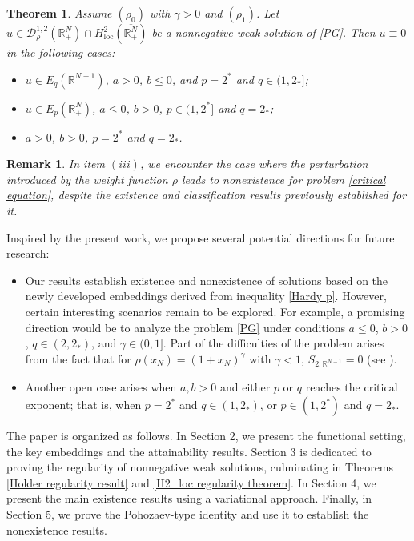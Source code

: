 \documentclass[12pt,reqno]{amsart}
\newtheorem{theorem}{Theorem}[section]
\newtheorem{remark}{Remark}[section]
\begin{document}
\begin{theorem}\label{Nonexistence2}Assume $(\rho_0)$ with $\gamma>0$ and $(\rho_1)$. Let $u\in \mathcal{D}^{1,2}_\rho(\mathds{R}^N_+)\cap H^2_{\mathrm{loc}}(\overline{\mathds{R}^N_+})$ be a nonnegative weak solution of \eqref{PG}. Then $u\equiv 0$ in the following cases:
\begin{itemize}
\item[$(i)$] $u\in E_q(\mathds{R}^{N-1})$, $a > 0$, $b \leq 0$, and $p = 2^\ast$ and $q\in(1,2_\ast]$;
\item[$(ii)$] $u\in E_p(\mathds{R}^N_+)$, $a \leq 0$, $b > 0$, $p\in(1,2^\ast]$ and $q = 2_\ast$;
\item [$(iii)$] $a>0$, $b>0$, $p= 2^\ast$ and $q= 2_\ast$.
\end{itemize}
\end{theorem}

\begin{remark}
In item $(iii)$, we encounter the case where the perturbation introduced by the weight function $\rho$ leads to nonexistence for problem \eqref{critical equation}, despite the existence and classification results previously established for it.
\end{remark}

Inspired by the present work, we propose several potential directions for future research:

\begin{itemize}
\item Our results establish existence and nonexistence of solutions based on the newly developed embeddings derived from inequality \eqref{Hardy p}. However, certain interesting scenarios remain to be explored. For example, a promising direction would be to analyze the problem \eqref{PG} under conditions $a \leq 0$, $b > 0$, $q \in (2, 2_\ast)$, and $\gamma \in (0,1]$. Part of the difficulties of the problem arises from the fact that for $\rho(x_N)=(1+x_N)^\gamma$ with $\gamma<1$, $S_{2,\mathds{R}^{N-1}}=0$ (see \cite[Theorem 2]{Do-Freire-Medeiros 2}).

\item Another open case arises when $a, b > 0$ and either $p$ or $q$ reaches the critical exponent; that is, when $p = 2^\ast$ and $q \in (1, 2_\ast)$, or $p \in (1, 2^\ast)$ and $q = 2_\ast$.
\end{itemize}

The paper is organized as follows. In Section 2, we present the functional setting, the key embeddings and the attainability results. Section 3 is dedicated to proving the regularity of nonnegative weak solutions, culminating in Theorems \ref{Holder regularity result} and \ref{H2_loc regularity theorem}. In Section 4, we present the main existence results using a variational approach. Finally, in Section 5, we prove the Pohozaev-type identity and use it to establish the nonexistence results. 
\bigskip 
\end{document}
